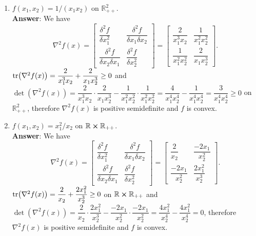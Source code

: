 \documentclass{article}
\begin{document}
\begin{enumerate}
\begin{enumerate}
                  \item $f(x_1,x_2)=1/(x_1x_2)$ on $\mathbb{R}_{++}^2$.\\
                        \textbf{Answer}: We have \[
                              \nabla^2 f(x)=\begin{bmatrix}
                                    \dfrac{\delta^2 f}{\delta x_1^2} & \dfrac{\delta^2 f}{\delta x_1\delta x_2} \\\dfrac{\delta^2 f}{\delta x_2\delta x_1}&\dfrac{\delta^2 f}{\delta x_2^2}
                              \end{bmatrix}=\begin{bmatrix}
                                    \dfrac{2}{x_1^3x_2}   & \dfrac{1}{x_1^2x_2^2} \\
                                    \dfrac{1}{x_1^2x_2^2} & \dfrac{2}{x_1x_2^3}
                              \end{bmatrix}.
                        \] $\tr(\nabla^2 f(x))=\dfrac{2}{x_1^3x_2}+\dfrac{2}{x_1x_2^3}\geq 0$ and $\det(\nabla^2 f(x))=\dfrac{2}{x_1^3x_2}\cdot\dfrac{2}{x_1x_2^3}-\dfrac{1}{x_1^2x_2^2}\cdot\dfrac{1}{x_1^2x_2^2}=\dfrac{4}{x_1^4x_2^4}-\dfrac{1}{x_1^4x_2^4}=\dfrac{3}{x_1^4x_2^4}\geq 0$ on $\mathbb{R}_{++}^2$, therefore $\nabla^2 f(x)$ is positive semidefinite and $f$ is convex.
                  \item $f(x_1,x_2)=x_1^2/x_2$ on $\mathbb{R}\cross\mathbb{R}_{++}$.\\
                        \textbf{Answer}: We have \[
                              \nabla^2 f(x)=\begin{bmatrix}
                                    \dfrac{\delta^2 f}{\delta x_1^2} & \dfrac{\delta^2 f}{\delta x_1\delta x_2} \\\dfrac{\delta^2 f}{\delta x_2\delta x_1}&\dfrac{\delta^2 f}{\delta x_2^2}
                              \end{bmatrix}=\begin{bmatrix}
                                    \dfrac{2}{x_2}       & \dfrac{-2x_1}{x_2^2}  \\
                                    \dfrac{-2x_1}{x_2^2} & \dfrac{2x_1^2}{x_2^3}
                              \end{bmatrix}.
                        \] $\tr(\nabla^2 f(x))=\dfrac{2}{x_2}+\dfrac{2x_1^2}{x_2^3}\geq 0$ on $\mathbb{R}\cross\mathbb{R}_{++}$ and $\det(\nabla^2 f(x))=\dfrac{2}{x_2}\cdot\dfrac{2x_1^2}{x_2^3}-\dfrac{-2x_1}{x_2^2}\cdot\dfrac{-2x_1}{x_2^2}=\dfrac{4x_1^2}{x_2^4}-\dfrac{4x_1^2}{x_2^4}=0$, therefore $\nabla^2 f(x)$ is positive semidefinite and $f$ is convex.

\end{enumerate}
\end{enumerate}
\end{document}
